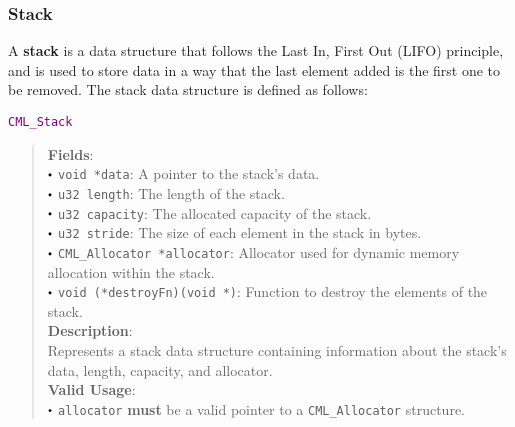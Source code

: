 \documentclass[a4paper,oneside,8pt]{extarticle}
\newcommand{\struct}[1]{
  \noindent\textcolor{purple}{\texttt{#1}}
  \vspace{-0.3em}
}
\renewcommand{\dot}{\raisebox{0.3ex}{\scalebox{0.6}{$\bullet$}}}
\theoremstyle{definition}
\begin{document}
\subsubsection{Stack}

A \textbf{stack} is a data structure that follows the Last In, First Out (LIFO) principle, and is used to store data in a way that the last element added is the first one to be removed. The stack data structure is defined as follows: \newline

\struct{CML\_Stack}
\begin{quote}
  \textbf{Fields}: \\
  $\dot$ \texttt{void *data}: A pointer to the stack's data. \\
  $\dot$ \texttt{u32 length}: The length of the stack. \\
  $\dot$ \texttt{u32 capacity}: The allocated capacity of the stack. \\
  $\dot$ \texttt{u32 stride}: The size of each element in the stack in bytes. \\
  $\dot$ \texttt{CML\_Allocator *allocator}: Allocator used for dynamic memory allocation within the stack. \\
  $\dot$ \texttt{void (*destroyFn)(void *)}: Function to destroy the elements of the stack. \\
  
  \vspace{-0.75em}
  \textbf{Description}: \\
  Represents a stack data structure containing information about the stack's data, length, capacity, and allocator. \\

  \vspace{-0.75em}
  \textbf{Valid Usage}: \\
  $\dot$ \texttt{allocator} \textbf{must} be a valid pointer to a \texttt{CML\_Allocator} structure. \\
\end{quote}
\end{document}
